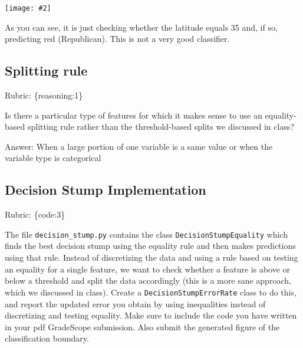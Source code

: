 \documentclass{article}
\def\rubric#1{\gre{Rubric: \{#1\}}}{}
\def\ans#1{\par\gre{Answer: #1}}
\def\blu#1{{\color{blu}#1}}
\def\gre#1{{\color{gre}#1}}
\newcommand{\centerfig}[2]{\begin{center}\texttt{[image: \#2]}\end{center}}
\begin{document}
\centerfig{0.7}{../figs/q6_decisionBoundary}

As you can see, it is just checking whether the latitude equals 35 and, if so, predicting red (Republican).
This is not a very good classifier. 

\subsection{Splitting rule}
\rubric{reasoning:1}

Is there a particular type of features for which it makes sense to use an equality-based splitting rule rather than the threshold-based splits we discussed in class?
\ans{When a large portion of one variable is a same value or when the variable type is categorical}

\subsection{Decision Stump Implementation}
\rubric{code:3}

The file \texttt{decision\string_stump.py} contains the class \texttt{DecisionStumpEquality} which 
finds the best decision stump using the equality rule and then makes predictions using that
rule. Instead of discretizing the data and using a rule based on testing an equality for 
a single feature, we want to check whether a feature is above or below a threshold and 
split the data accordingly (this is a more sane approach, which we discussed in class). 
\blu{Create a \texttt{DecisionStumpErrorRate} class to do this, and report the updated error you 
obtain by using inequalities instead of discretizing and testing equality. Make sure to include the code you have written in your pdf GradeScope submission. Also submit the generated figure of the classification boundary.}
\end{document}
